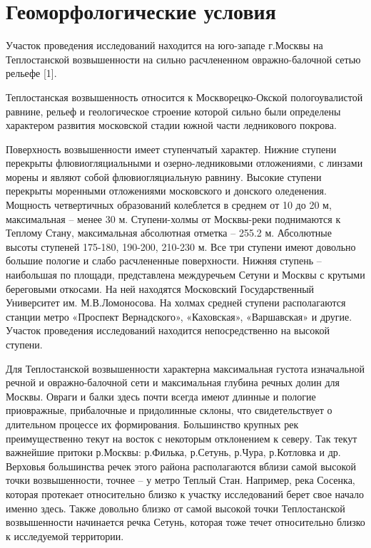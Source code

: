 \chapter*{Геоморфологические условия} 

Участок проведения исследований находится на юго-западе г.Москвы на Теплостанской возвышенности на сильно расчлененном овражно-балочной сетью рельефе [1]. 

Теплостанская возвышенность относится к Москворецко-Окской пологоувалистой равнине, рельеф и геологическое строение которой сильно были определены характером развития московской стадии южной части ледникового покрова. 

Поверхность возвышенности имеет ступенчатый характер. Нижние ступени перекрыты флювиогляциальными и озерно-ледниковыми отложениями, с линзами морены и являют собой флювиогляциальную равнину. Высокие ступени перекрыты моренными отложениями московского и донского оледенения. Мощность четвертичных образований колеблется в среднем от 10 до 20 м, максимальная – менее 30 м. Ступени-холмы от Москвы-реки поднимаются к Теплому Стану, максимальная абсолютная отметка – 255.2 м. Абсолютные высоты ступеней 175-180, 190-200, 210-230 м. Все три ступени имеют довольно большие пологие и слабо расчлененные поверхности. Нижняя ступень – наибольшая по площади, представлена междуречьем Сетуни и Москвы с крутыми береговыми откосами. На ней находятся Московский Государственный Университет им. М.В.Ломоносова. На холмах средней ступени располагаются станции метро «Проспект Вернадского», «Каховская», «Варшавская» и другие. Участок проведения исследований находится непосредственно на высокой ступени. 

Для Теплостанской возвышенности характерна максимальная густота изначальной речной и овражно-балочной сети и максимальная глубина речных долин для Москвы. Овраги и балки здесь почти всегда имеют длинные и пологие приовражные, прибалочные и придолинные склоны, что свидетельствует о длительном процессе их формирования. Большинство крупных рек преимущественно текут на восток с некоторым отклонением к северу. Так текут важнейшие притоки р.Москвы: р.Филька, р.Сетунь, р.Чура, р.Котловка и др.  Верховья большинства речек этого района располагаются вблизи самой высокой точки возвышенности, точнее – у метро Теплый Стан. Например, река Сосенка, которая протекает относительно близко к участку исследований берет свое начало именно здесь. Также довольно близко от самой высокой точки Теплостанской возвышенности начинается речка Сетунь, которая тоже течет относительно близко к исследуемой территории.